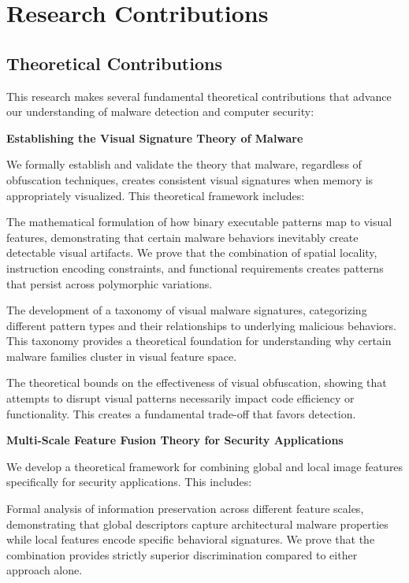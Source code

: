 \section{Research Contributions}
\label{sec:contributions}

\subsection{Theoretical Contributions}
\label{subsec:theoretical_contributions}

This research makes several fundamental theoretical contributions that advance our understanding of malware detection and computer security:

\textbf{Establishing the Visual Signature Theory of Malware}

We formally establish and validate the theory that malware, regardless of obfuscation techniques, creates consistent visual signatures when memory is appropriately visualized. This theoretical framework includes:

The mathematical formulation of how binary executable patterns map to visual features, demonstrating that certain malware behaviors inevitably create detectable visual artifacts. We prove that the combination of spatial locality, instruction encoding constraints, and functional requirements creates patterns that persist across polymorphic variations.

The development of a taxonomy of visual malware signatures, categorizing different pattern types and their relationships to underlying malicious behaviors. This taxonomy provides a theoretical foundation for understanding why certain malware families cluster in visual feature space.

The theoretical bounds on the effectiveness of visual obfuscation, showing that attempts to disrupt visual patterns necessarily impact code efficiency or functionality. This creates a fundamental trade-off that favors detection.

\textbf{Multi-Scale Feature Fusion Theory for Security Applications}

We develop a theoretical framework for combining global and local image features specifically for security applications. This includes:

Formal analysis of information preservation across different feature scales, demonstrating that global descriptors capture architectural malware properties while local features encode specific behavioral signatures. We prove that the combination provides strictly superior discrimination compared to either approach alone.

